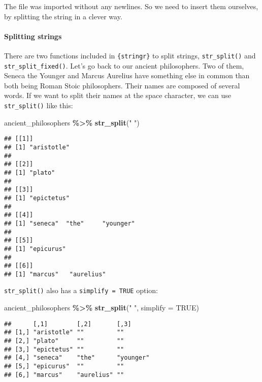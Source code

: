 \documentclass[
]{article}
\newenvironment{Shaded}{\begin{snugshade}}{\end{snugshade}}
\newcommand{\DataTypeTok}[1]{\textcolor[rgb]{0.13,0.29,0.53}{#1}}
\newcommand{\KeywordTok}[1]{\textcolor[rgb]{0.13,0.29,0.53}{\textbf{#1}}}
\newcommand{\NormalTok}[1]{#1}
\newcommand{\OperatorTok}[1]{\textcolor[rgb]{0.81,0.36,0.00}{\textbf{#1}}}
\newcommand{\OtherTok}[1]{\textcolor[rgb]{0.56,0.35,0.01}{#1}}
\newcommand{\StringTok}[1]{\textcolor[rgb]{0.31,0.60,0.02}{#1}}
\begin{document}
The file was imported without any newlines. So we need to insert them ourselves, by splitting the
string in a clever way.

\hypertarget{splitting-strings}{%
\paragraph{Splitting strings}\label{splitting-strings}}

There are two functions included in \texttt{\{stringr\}} to split strings, \texttt{str\_split()} and \texttt{str\_split\_fixed()}.
Let's go back to our ancient philosophers. Two of them, Seneca the Younger and Marcus Aurelius have
something else in common than both being Roman Stoic philosophers. Their names are composed of several
words. If we want to split their names at the space character, we can use \texttt{str\_split()} like this:

\begin{Shaded}
\begin{Highlighting}[]
\NormalTok{ancient\_philosophers }\OperatorTok{\%\textgreater{}\%}
\StringTok{  }\KeywordTok{str\_split}\NormalTok{(}\StringTok{" "}\NormalTok{)}
\end{Highlighting}
\end{Shaded}

\begin{verbatim}
## [[1]]
## [1] "aristotle"
## 
## [[2]]
## [1] "plato"
## 
## [[3]]
## [1] "epictetus"
## 
## [[4]]
## [1] "seneca"  "the"     "younger"
## 
## [[5]]
## [1] "epicurus"
## 
## [[6]]
## [1] "marcus"   "aurelius"
\end{verbatim}

\texttt{str\_split()} also has a \texttt{simplify\ =\ TRUE} option:

\begin{Shaded}
\begin{Highlighting}[]
\NormalTok{ancient\_philosophers }\OperatorTok{\%\textgreater{}\%}
\StringTok{  }\KeywordTok{str\_split}\NormalTok{(}\StringTok{" "}\NormalTok{, }\DataTypeTok{simplify =} \OtherTok{TRUE}\NormalTok{)}
\end{Highlighting}
\end{Shaded}

\begin{verbatim}
##      [,1]        [,2]       [,3]     
## [1,] "aristotle" ""         ""       
## [2,] "plato"     ""         ""       
## [3,] "epictetus" ""         ""       
## [4,] "seneca"    "the"      "younger"
## [5,] "epicurus"  ""         ""       
## [6,] "marcus"    "aurelius" ""
\end{verbatim}
\end{document}
